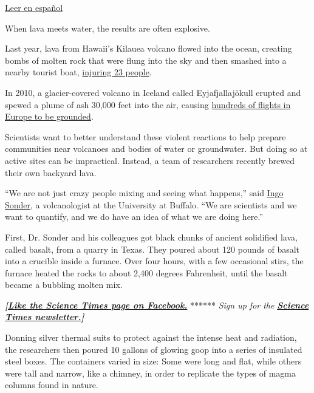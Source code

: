 \href{https://www.nytimes3xbfgragh.onion/es/2019/01/12/volcanes-explosiones-lava/}{Leer
en español}

When lava meets water, the results are often explosive.

Last year, lava from Hawaii's Kilauea volcano flowed into the ocean,
creating bombs of molten rock that were flung into the sky and then
smashed into a nearby tourist boat,
\href{https://www.nytimes3xbfgragh.onion/2018/07/17/us/lava-bomb-boat-video-hawaii.html}{injuring
23 people}.

In 2010, a glacier-covered volcano in Iceland called Eyjafjallajökull
erupted and spewed a plume of ash 30,000 feet into the air, causing
\href{https://www.nytimes3xbfgragh.onion/2010/04/16/world/europe/16ash.html?rref=collection\%2Ftimestopic\%2FEyjafjallajokull\%20Volcano\&action=click\&contentCollection=timestopics\&region=stream\&module=stream_unit\&version=latest\&contentPlacement=20\&pgtype=collection}{hundreds
of flights in Europe to be grounded}.

Scientists want to better understand these violent reactions to help
prepare communities near volcanoes and bodies of water or groundwater.
But doing so at active sites can be impractical. Instead, a team of
researchers recently brewed their own backyard lava.

``We are not just crazy people mixing and seeing what happens,'' said
\href{https://www.acsu.buffalo.edu/~ingomark/}{Ingo Sonder}, a
volcanologist at the University at Buffalo. ``We are scientists and we
want to quantify, and we do have an idea of what we are doing here.''

First, Dr. Sonder and his colleagues got black chunks of ancient
solidified lava, called basalt, from a quarry in Texas. They poured
about 120 pounds of basalt into a crucible inside a furnace. Over four
hours, with a few occasional stirs, the furnace heated the rocks to
about 2,400 degrees Fahrenheit, until the basalt became a bubbling
molten mix.

\textbf{\emph{{[}}\href{http://on.fb.me/1paTQ1h}{\emph{Like the Science
Times page on Facebook.}}} ****** \emph{\textbar{} Sign up for the}
\textbf{\href{http://nyti.ms/1MbHaRU}{\emph{Science Times
newsletter.}}\emph{{]}}}

Donning silver thermal suits to protect against the intense heat and
radiation, the researchers then poured 10 gallons of glowing goop into a
series of insulated steel boxes. The containers varied in size: Some
were long and flat, while others were tall and narrow, like a chimney,
in order to replicate the types of magma columns found in nature.

